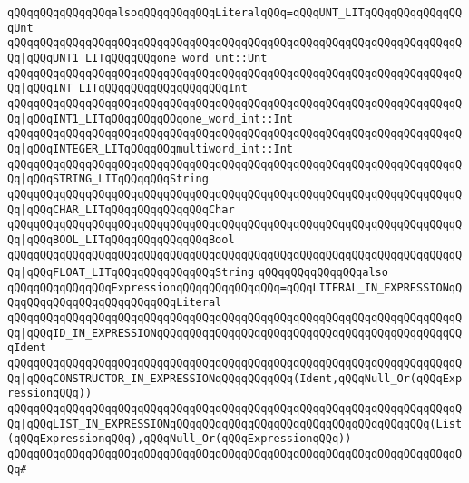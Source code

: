 \newline
\verb|qQQqqQQqqQQqqQQqalsoqQQqqQQqqQQqLiteralqQQq=qQQqUNT_LITqQQqqQQqqQQqqQQqUnt|\newline
\verb|qQQqqQQqqQQqqQQqqQQqqQQqqQQqqQQqqQQqqQQqqQQqqQQqqQQqqQQqqQQqqQQqqQQqqQQq|\verb#|qQQqUNT1_LITqQQqqQQqone_word_unt::Unt#\newline
\verb|qQQqqQQqqQQqqQQqqQQqqQQqqQQqqQQqqQQqqQQqqQQqqQQqqQQqqQQqqQQqqQQqqQQqqQQq|\verb#|qQQqINT_LITqQQqqQQqqQQqqQQqqQQqInt#\newline
\verb|qQQqqQQqqQQqqQQqqQQqqQQqqQQqqQQqqQQqqQQqqQQqqQQqqQQqqQQqqQQqqQQqqQQqqQQq|\verb#|qQQqINT1_LITqQQqqQQqqQQqone_word_int::Int#\newline
\verb|qQQqqQQqqQQqqQQqqQQqqQQqqQQqqQQqqQQqqQQqqQQqqQQqqQQqqQQqqQQqqQQqqQQqqQQq|\verb#|qQQqINTEGER_LITqQQqqQQqmultiword_int::Int#\newline
\verb|qQQqqQQqqQQqqQQqqQQqqQQqqQQqqQQqqQQqqQQqqQQqqQQqqQQqqQQqqQQqqQQqqQQqqQQq|\verb#|qQQqSTRING_LITqQQqqQQqString#\newline
\verb|qQQqqQQqqQQqqQQqqQQqqQQqqQQqqQQqqQQqqQQqqQQqqQQqqQQqqQQqqQQqqQQqqQQqqQQq|\verb#|qQQqCHAR_LITqQQqqQQqqQQqqQQqChar#\newline
\verb|qQQqqQQqqQQqqQQqqQQqqQQqqQQqqQQqqQQqqQQqqQQqqQQqqQQqqQQqqQQqqQQqqQQqqQQq|\verb#|qQQqBOOL_LITqQQqqQQqqQQqqQQqBool#\newline
\verb|qQQqqQQqqQQqqQQqqQQqqQQqqQQqqQQqqQQqqQQqqQQqqQQqqQQqqQQqqQQqqQQqqQQqqQQq|\verb#|qQQqFLOAT_LITqQQqqQQqqQQqqQQqString#\newline
\newline
\verb|qQQqqQQqqQQqqQQqalso|\newline
\verb|qQQqqQQqqQQqqQQqExpressionqQQqqQQqqQQqqQQq=qQQqLITERAL_IN_EXPRESSIONqQQqqQQqqQQqqQQqqQQqqQQqqQQqLiteral|\newline
\verb|qQQqqQQqqQQqqQQqqQQqqQQqqQQqqQQqqQQqqQQqqQQqqQQqqQQqqQQqqQQqqQQqqQQqqQQq|\verb#|qQQqID_IN_EXPRESSIONqQQqqQQqqQQqqQQqqQQqqQQqqQQqqQQqqQQqqQQqqQQqqQQqIdent#\newline
\verb|qQQqqQQqqQQqqQQqqQQqqQQqqQQqqQQqqQQqqQQqqQQqqQQqqQQqqQQqqQQqqQQqqQQqqQQq|\verb#|qQQqCONSTRUCTOR_IN_EXPRESSIONqQQqqQQqqQQq(Ident,qQQqNull_Or(qQQqExpressionqQQq))#\newline
\verb|qQQqqQQqqQQqqQQqqQQqqQQqqQQqqQQqqQQqqQQqqQQqqQQqqQQqqQQqqQQqqQQqqQQqqQQq|\verb#|qQQqLIST_IN_EXPRESSIONqQQqqQQqqQQqqQQqqQQqqQQqqQQqqQQqqQQqqQQq(List(qQQqExpressionqQQq),qQQqNull_Or(qQQqExpressionqQQq))#\newline
\verb|qQQqqQQqqQQqqQQqqQQqqQQqqQQqqQQqqQQqqQQqqQQqqQQqqQQqqQQqqQQqqQQqqQQqqQQq#|\newline

